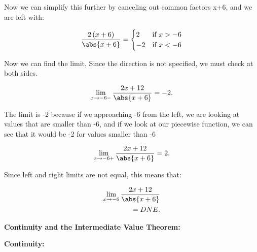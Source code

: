 \documentclass{report}
\begin{document}
        \bigbreak \noindent 
        Now we can simplify this further by canceling out common factors x+6, and we are left with:

        \bigbreak \noindent 
           \begin{equation}
            \frac{2 \left(x+6\right)}{\abs{x+6}} =
                \begin{cases}
                     2 & \text{if } x > -6 \\
                     -2 & \text{if } x < -6 
                \end{cases}
            \end{equation}

        \bigbreak \noindent 
        Now we can find the limit, Since the direction is not specified, we must check at both sides.

        \bigbreak \noindent 
        \begin{align*}
            \lim\limits_{x \to -6- }{\frac{2x+12}{\abs{x+6}}} = -2
        .\end{align*}

        \bigbreak \noindent 
        The limit is -2 because if we approaching -6 from the left, we are looking
        at values that are smaller than -6, and if we look at our piecewise function, we can
        see that it would be -2 for values smaller than -6

        \begin{align*}
            \lim\limits_{x \to -6+}{\frac{2x+12}{\abs{x+6}}} = 2
        .\end{align*}        

        \bigbreak \noindent 
        Since left and right limits are not equal, this means that:

        \begin{align*}
            \lim\limits_{x \to -6}{\frac{2x+12}{\abs{x+6}}} \\ 
            = DNE
        .\end{align*}
        
        \pagebreak
        \begin{Large}
            \noindent \textbf{Continuity and the Intermediate Value Theorem:}
        \end{Large}

        \bigbreak \noindent \bigbreak \noindent \bigbreak \noindent 
        \begin{large}
            \textbf{Continuity:}
        \end{large}
\end{document}
